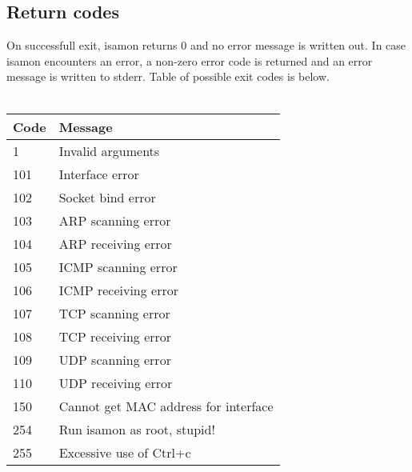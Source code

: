 \documentclass[11pt,a4paper]{article}
\begin{document}
	\subsection{Return codes}
		On successfull exit, isamon returns 0 and no error message is written out.
		In case isamon encounters an error, a non-zero error code is returned and an error message is written to stderr. Table of possible exit codes is below.\\\\

		\begin{tabular}{|l|l|}
			\hline
			\textbf{Code}  & \textbf{Message} \\\hline
			1     & Invalid arguments \\\hline
			101   & Interface error \\\hline
			102   & Socket bind error \\\hline
			103   & ARP scanning error \\\hline
			104   & ARP receiving error \\\hline
			105   & ICMP scanning error \\\hline
			106   & ICMP receiving error \\\hline
			107   & TCP scanning error \\\hline
			108   & TCP receiving error \\\hline
			109   & UDP scanning error \\\hline
			110   & UDP receiving error \\\hline
			150   & Cannot get MAC address for interface \\\hline
			254   & Run isamon as root, stupid! \\\hline
			255   & Excessive use of Ctrl+c \\\hline
		\end{tabular}
\end{document}
